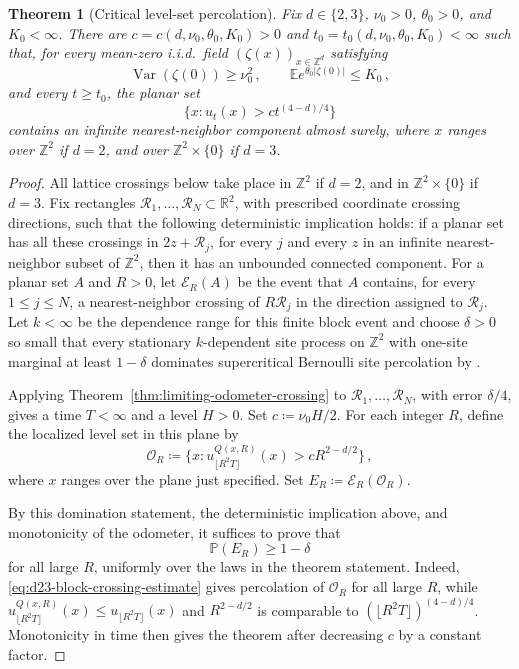 \documentclass[11pt]{amsart}
\theoremstyle{plain}
\newtheorem{theorem}{Theorem}[section]
\theoremstyle{definition}
\newcommand{\Z}{\mathbb{Z}}
\newcommand{\R}{\mathbb{R}}
\newcommand{\E}{\mathbb{E}}
\renewcommand{\P}{\mathbb{P}}
\DeclareMathOperator{\Var}{Var}
\begin{document}
\begin{theorem}[Critical level-set percolation]
\label{thm:d23-critical-level-percolation}
Fix $d\in\{2,3\}$, $\nu_{0}>0$, $\theta_{0}>0$, and $K_{0}<\infty$. There are
$c=c(d,\nu_{0},\theta_{0},K_{0})>0$ and
$t_0=t_0(d,\nu_{0},\theta_{0},K_{0})<\infty$ such that, for every mean-zero i.i.d.\
field $(\zeta(x))_{x\in\Z^d}$ satisfying
\[
    \Var(\zeta(0))\geq\nu_{0}^2\, ,\qquad \E e^{\theta_{0}|\zeta(0)|}\leq K_{0}\, ,
\]
and every $t\geq t_0$, the planar set
\[
    \{x:u_t(x)>c t^{(4-d)/4}\}
\]
contains an infinite nearest-neighbor component almost surely, where $x$ ranges
over $\Z^2$ if $d=2$, and over $\Z^2\times\{0\}$ if $d=3$.
\end{theorem}
\begin{proof}
All lattice crossings below take place in $\Z^2$ if $d=2$, and in
$\Z^2\times\{0\}$ if $d=3$. Fix rectangles
$\mathcal R_1,\ldots,\mathcal R_N\subset\R^2$, with prescribed coordinate
crossing directions, such that the following deterministic implication holds:
if a planar set has all these crossings in $2z+\mathcal R_j$, for every $j$
and every $z$ in an infinite nearest-neighbor subset of $\Z^2$, then it has an
unbounded connected component. For a planar set $A$ and $R>0$, let
$\mathcal E_R(A)$ be the event that $A$ contains, for every $1\leq j\leq N$, a
nearest-neighbor crossing of $R\mathcal R_j$ in the direction assigned to
$\mathcal R_j$. Let $k<\infty$ be the dependence range for this finite block
event and choose $\delta>0$ so small that every stationary $k$-dependent site
process on $\Z^2$ with one-site marginal at least $1-\delta$ dominates
supercritical Bernoulli site percolation by \citet[Corollary~1.4]{LSS}.

Applying Theorem~\ref{thm:limiting-odometer-crossing} to
$\mathcal R_1,\ldots,\mathcal R_N$, with error $\delta/4$, gives a time
$T<\infty$ and a level $H>0$. Set $c\coloneqq\nu_{0}H/2$.
For each integer $R$, define the localized level set in this plane by
\[
    \mathcal O_R\coloneqq
    \{x:u_{\lfloor R^2T\rfloor}^{Q(x,R)}(x)>cR^{2-d/2}\}\, ,
\]
where $x$ ranges over the plane just specified.
Set $E_R\coloneqq\mathcal E_R(\mathcal O_R)$.

By this domination statement, the deterministic implication above, and
monotonicity of the odometer, it suffices to prove that
\begin{equation}\label{eq:d23-block-crossing-estimate}
    \P(E_R)\geq1-\delta
\end{equation}
for all large $R$, uniformly over the laws in the theorem statement. Indeed,
\eqref{eq:d23-block-crossing-estimate} gives percolation of $\mathcal O_R$ for
all large $R$, while
$u_{\lfloor R^2T\rfloor}^{Q(x,R)}(x)\leq u_{\lfloor R^2T\rfloor}(x)$ and
$R^{2-d/2}$ is comparable to
$(\lfloor R^2T\rfloor)^{(4-d)/4}$. Monotonicity in time then gives the theorem
after decreasing $c$ by a constant factor.


\end{proof}
\end{document}
